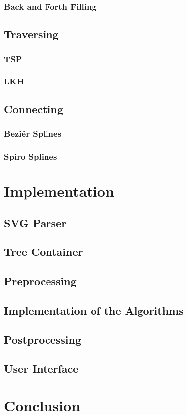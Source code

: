 \documentclass[10pt,a4paper]{article}
\begin{document}
\subsubsection{Back and Forth Filling}

\subsection{Traversing}
\subsubsection{TSP}
\subsubsection{LKH}

\subsection{Connecting}
\subsubsection{Beziér Splines}
\subsubsection{Spiro Splines}

\section{Implementation}
\subsection{SVG Parser}
\subsection{Tree Container}
\subsection{Preprocessing}
\subsection{Implementation of the Algorithms}
\subsection{Postprocessing}
\subsection{User Interface}

\section{Conclusion}
\end{document}
